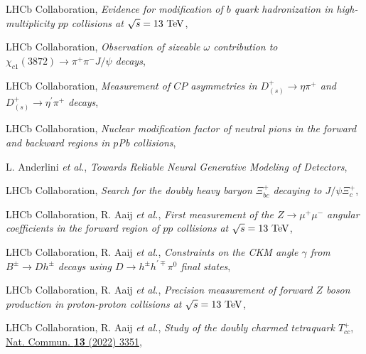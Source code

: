 \begin{cvcontent}
\begin{enumerate}[label={[\arabic*]}, leftmargin=1.5cm]
    \item LHCb Collaboration,
    \emph{Evidence for modification of $b$ quark hadronization in high-multiplicity $pp$ collisions at $\sqrt{s} = 13~\rm{TeV}$},
    \item LHCb Collaboration,
    \emph{Observation of sizeable $\omega$ contribution to $\chi_{c1}(3872) \to \pi^+ \pi^- J/\psi$ decays},
    \item LHCb Collaboration,
    \emph{Measurement of $CP$ asymmetries in $D^+_{(s)}\rightarrow \eta \pi^+$ and $D^+_{(s)}\rightarrow \eta^{\prime} \pi^+$ decays},
    \item LHCb Collaboration,
    \emph{Nuclear modification factor of neutral pions in the forward and backward regions in $p$Pb collisions},
    \item L. Anderlini \emph{et al.},
    \emph{Towards Reliable Neural Generative Modeling of Detectors},
    \sloppy
    \item LHCb Collaboration,
    \emph{Search for the doubly heavy baryon $\Xi_{bc}^{+}$ decaying to $J/\psi \Xi_{c}^{+}$},
    \item LHCb Collaboration, R. Aaij \emph{et al.},
    \emph{First measurement of the $Z\rightarrow \mu^+ \mu^-$ angular coefficients in the forward region of $pp$ collisions at $\sqrt{s}=13~\rm{TeV}$},
    \item LHCb Collaboration, R. Aaij \emph{et al.}, 
    \emph{Constraints on the CKM angle $\gamma$ from $B^\pm \rightarrow Dh^\pm$ decays using $D \rightarrow h^\pm h^{\prime\mp}\pi^0$ final states},
    \item LHCb Collaboration, R. Aaij \emph{et al.}, 
    \emph{Precision measurement of forward $Z$ boson production in proton-proton collisions at $\sqrt{s} = 13~\rm{TeV}$},
  \end{enumerate}
  \vspace{3mm}
  \begin{enumerate}[label={[\arabic*]}, leftmargin=1.5cm]
    \item LHCb Collaboration, R. Aaij \emph{et al.}, 
    \emph{Study of the doubly charmed tetraquark $T_{cc}^+$},
    \href{https://doi.org/10.1038/s41467-022-30206-w}{Nat. Commun. \textbf{13} (2022) 3351},

\end{enumerate}
\end{cvcontent}
